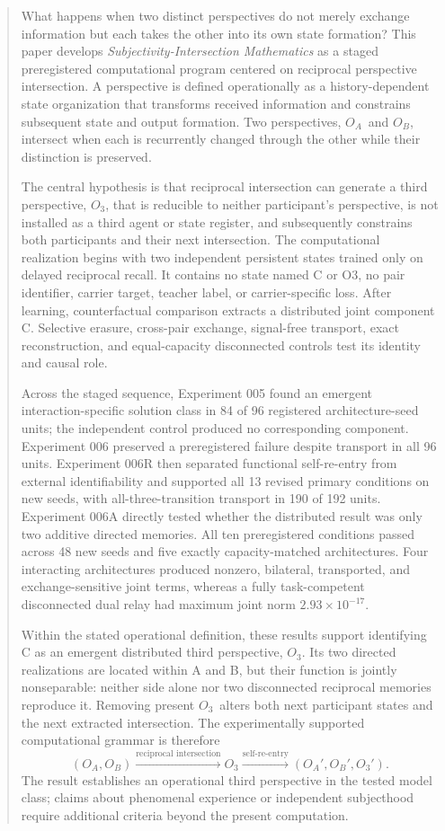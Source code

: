 \documentclass[11pt,a4paper]{article}
\newcommand{\OA}{\ensuremath{O_{A}}}
\newcommand{\OB}{\ensuremath{O_{B}}}
\newcommand{\Othree}{\ensuremath{O_{3}}}
\begin{document}
\begin{abstract}
What happens when two distinct perspectives do not merely exchange information but each takes the other into its own state formation? This paper develops \emph{Subjectivity-Intersection Mathematics} as a staged preregistered computational program centered on reciprocal perspective intersection. A perspective is defined operationally as a history-dependent state organization that transforms received information and constrains subsequent state and output formation. Two perspectives, \OA\ and \OB, intersect when each is recurrently changed through the other while their distinction is preserved.

The central hypothesis is that reciprocal intersection can generate a third perspective, \Othree, that is reducible to neither participant's perspective, is not installed as a third agent or state register, and subsequently constrains both participants and their next intersection. The computational realization begins with two independent persistent states trained only on delayed reciprocal recall. It contains no state named C or O3, no pair identifier, carrier target, teacher label, or carrier-specific loss. After learning, counterfactual comparison extracts a distributed joint component C. Selective erasure, cross-pair exchange, signal-free transport, exact reconstruction, and equal-capacity disconnected controls test its identity and causal role.

Across the staged sequence, Experiment 005 found an emergent interaction-specific solution class in 84 of 96 registered architecture-seed units; the independent control produced no corresponding component. Experiment 006 preserved a preregistered failure despite transport in all 96 units. Experiment 006R then separated functional self-re-entry from external identifiability and supported all 13 revised primary conditions on new seeds, with all-three-transition transport in 190 of 192 units. Experiment 006A directly tested whether the distributed result was only two additive directed memories. All ten preregistered conditions passed across 48 new seeds and five exactly capacity-matched architectures. Four interacting architectures produced nonzero, bilateral, transported, and exchange-sensitive joint terms, whereas a fully task-competent disconnected dual relay had maximum joint norm $2.93\times10^{-17}$.

Within the stated operational definition, these results support identifying C as an emergent distributed third perspective, \Othree. Its two directed realizations are located within A and B, but their function is jointly nonseparable: neither side alone nor two disconnected reciprocal memories reproduce it. Removing present \Othree\ alters both next participant states and the next extracted intersection. The experimentally supported computational grammar is therefore
\[
  (\OA,\OB) \xrightarrow{\text{reciprocal intersection}} \Othree
  \xrightarrow{\text{self-re-entry}} (\OA',\OB',\Othree').
\]
The result establishes an operational third perspective in the tested model class; claims about phenomenal experience or independent subjecthood require additional criteria beyond the present computation.
\end{abstract}
\end{document}
